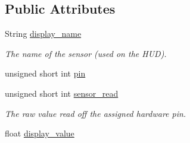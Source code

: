 \subsection*{Public Attributes}
\begin{DoxyCompactItemize}
\item 
String \hyperlink{classSensor_ae5ac222a8b6f8aa8268d644feb35bbd0}{display\+\_\+name}\hypertarget{classSensor_ae5ac222a8b6f8aa8268d644feb35bbd0}{}\label{classSensor_ae5ac222a8b6f8aa8268d644feb35bbd0}

\begin{DoxyCompactList}\small\item\em The name of the sensor (used on the H\+UD). \end{DoxyCompactList}\item 
unsigned short int \hyperlink{classSensor_a1533fd4f5fd1f6552141cb41c8a52240}{pin}
\item 
unsigned short int \hyperlink{classSensor_a6a75d312753433dcd62e99bea51efb5f}{sensor\+\_\+read}\hypertarget{classSensor_a6a75d312753433dcd62e99bea51efb5f}{}\label{classSensor_a6a75d312753433dcd62e99bea51efb5f}

\begin{DoxyCompactList}\small\item\em The raw value read off the assigned hardware pin. \end{DoxyCompactList}\item 
float \hyperlink{classSensor_a68bb74b260b1a1bca9c740a89275f190}{display\+\_\+value}\hypertarget{classSensor_a68bb74b260b1a1bca9c740a89275f190}{}\label{classSensor_a68bb74b260b1a1bca9c740a89275f190}


\end{DoxyCompactItemize}
